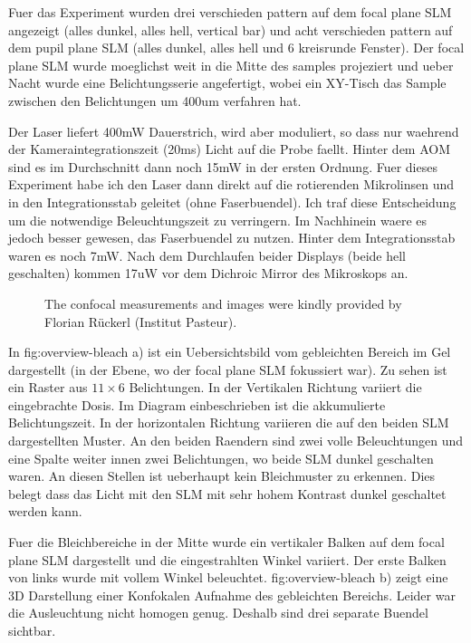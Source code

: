 Fuer das Experiment wurden drei verschieden pattern auf dem focal
plane SLM angezeigt (alles dunkel, alles hell, vertical bar) und acht
verschieden pattern auf dem pupil plane SLM (alles dunkel, alles hell
und 6 kreisrunde Fenster). Der focal plane SLM wurde moeglichst weit
in die Mitte des samples projeziert und ueber Nacht wurde eine
Belichtungsserie angefertigt, wobei ein XY-Tisch das Sample zwischen
den Belichtungen um 400um verfahren hat.


Der Laser liefert 400mW Dauerstrich, wird aber moduliert, so dass nur
waehrend der Kameraintegrationszeit (20ms) Licht auf die Probe
faellt. Hinter dem AOM sind es im Durchschnitt dann noch 15mW in der
ersten Ordnung. Fuer dieses Experiment habe ich den Laser dann direkt
auf die rotierenden Mikrolinsen und in den Integrationsstab geleitet
(ohne Faserbuendel). Ich traf diese Entscheidung um die notwendige
Beleuchtungszeit zu verringern. Im Nachhinein waere es jedoch besser
gewesen, das Faserbuendel zu nutzen. Hinter dem Integrationsstab waren
es noch 7mW. Nach dem Durchlaufen beider Displays (beide hell
geschalten) kommen 17uW vor dem Dichroic Mirror des Mikroskops an.

\begin{figure}[hbtp]
  \centering
  \caption{The confocal measurements and images were kindly provided
    by Florian R\"uckerl (Institut Pasteur).}
  \label{fig:overview-bleach}
\end{figure}

In fig:overview-bleach a) ist ein Uebersichtsbild vom gebleichten
Bereich im Gel dargestellt (in der Ebene, wo der focal plane SLM
fokussiert war).  Zu sehen ist ein Raster aus $11\times6$
Belichtungen. In der Vertikalen Richtung variiert die eingebrachte
Dosis. Im Diagram einbeschrieben ist die akkumulierte
Belichtungszeit. In der horizontalen Richtung variieren die auf den
beiden SLM dargestellten Muster. An den beiden Raendern sind zwei
volle Beleuchtungen und eine Spalte weiter innen zwei Belichtungen, wo
beide SLM dunkel geschalten waren. An diesen Stellen ist ueberhaupt
kein Bleichmuster zu erkennen. Dies belegt dass das Licht mit den SLM
mit sehr hohem Kontrast dunkel geschaltet werden kann.

Fuer die Bleichbereiche in der Mitte wurde ein vertikaler Balken auf
dem focal plane SLM dargestellt und die eingestrahlten Winkel
variiert. Der erste Balken von links wurde mit vollem Winkel
beleuchtet. fig:overview-bleach b) zeigt eine 3D Darstellung einer
Konfokalen Aufnahme des gebleichten Bereichs. Leider war die
Ausleuchtung nicht homogen genug. Deshalb sind drei separate Buendel
sichtbar.

